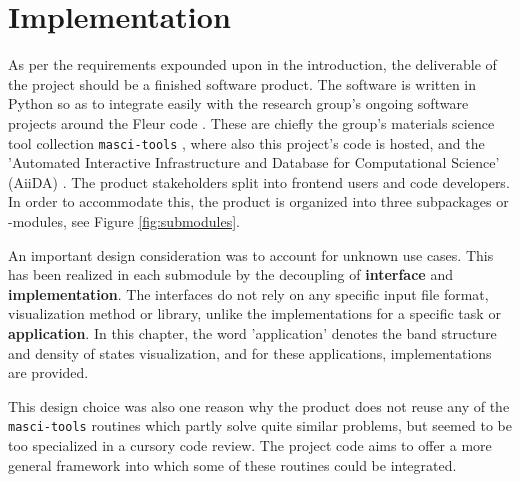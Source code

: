 
\chapter{Implementation}
\label{chap:implementation}


As per the requirements expounded upon in the introduction, the deliverable of
the project should be a finished software product. The software is written in
Python so as to integrate easily with the research group's ongoing software
projects around the Fleur code \cite{fleur}. These are chiefly the group's
materials science tool collection \texttt{masci-tools} \cite{masci-tools} ,
where also this project's code is hosted, and the 'Automated Interactive
Infrastructure and Database for Computational Science' (AiiDA) \cite{aiida}. The
product stakeholders split into frontend users and code developers. In order to
accommodate this, the product is organized into three subpackages or -modules,
see Figure \ref{fig:submodules}.

An important design consideration was to account for unknown use cases. This has
been realized in each submodule by the decoupling of \textbf{interface} and
\textbf{implementation}. The interfaces do not rely on any specific input file
format, visualization method or library, unlike the implementations for a
specific task or \textbf{application}. In this chapter, the word 'application'
denotes the band structure and density of states visualization, and for these
applications, implementations are provided.

This design choice was also one reason why the product does not reuse any of the
\texttt{masci-tools} routines which partly solve quite similar problems, but
seemed to be too specialized in a cursory code review. The project code aims to
offer a more general framework into which some of these routines could be
integrated.





